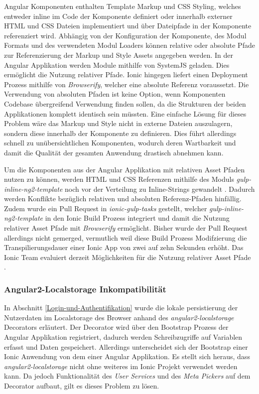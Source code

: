Angular Komponenten enthalten Template Markup und \ac{CSS} Styling, welches entweder inline im Code der Komponente
definiert oder innerhalb externer \ac{HTML} und \ac{CSS} Dateien implementiert und über Dateipfade in der Komponente referenziert wird.
Abhängig von der Konfiguration der Komponente, des Modul Formats und des verwendeten Modul Loaders
können relative oder absolute Pfade zur Referenzierung der Markup und Style Assets angegeben werden.
In der Angular Applikation werden Module mithilfe von SystemJS geladen. Dies ermöglicht die Nutzung relativer Pfade.
Ionic hingegen liefert einen Deployment Prozess mithilfe von \emph{Browserify}, welcher eine absolute Referenz voraussetzt.
Die Verwendung von absoluten Pfaden ist keine Option, wenn Komponenten Codebase übergreifend Verwendung finden sollen,
da die Strukturen der beiden Applikationen komplett identisch sein müssten.
Eine einfache Lösung für dieses Problem wäre das Markup und Style nicht in externe Dateien auszulagern,
sondern diese innerhalb der Komponente zu definieren.
Dies führt allerdings schnell zu unübersichtlichen Komponenten,
wodurch deren Wartbarkeit und damit die Qualität der gesamten Anwendung drastisch abnehmen kann.

Um die Komponenten aus der Angular Applikation mit relativen Asset Pfaden nutzen zu können,
werden \ac{HTML} und \ac{CSS} Referenzen mithilfe des Moduls \emph{gulp-inline-ng2-template} noch vor der Verteilung zu Inline-Strings gewandelt \cite{ludoh30:online}.
Dadurch werden Konflikte bezüglich relativen und absoluten Referenz-Pfaden hinfällig.
Zudem wurde ein Pull Request in \emph{ionic-gulp-tasks} gestellt, welcher \emph{gulp-inline-ng2-template}
in den Ionic Build Prozess integriert und damit die Nutzung relativer Asset Pfade mit \emph{Browserify} ermöglicht.
Bisher wurde der Pull Request allerdings nicht gemerged, vermutlich weil diese Build Prozess Modifzierung die
Transpilierungsdauer einer Ionic App von zwei auf zehn Sekunden erhöht.
Das Ionic Team evaluiert derzeit Möglichkeiten für die Nutzung relativer Asset Pfade \cite{relat31:online}.

\subsubsection{Angular2-Localstorage Inkompatibilität}
In Abschnitt \ref{Login-und-Authentifikation} wurde die lokale persistierung der Nutzerdaten im Localstorage
des Browser anhand des \emph{angular2-localstorage} Decorators erläutert.
Der Decorator wird über den Bootstrap Prozess der Angular Applikation registriert,
dadurch werden Schreibzugriffe auf Variablen erfasst und Daten gespeichert.
Allerdings unterscheidet sich der Bootstrap einer Ionic Anwendung von dem einer Angular Applikation.
Es stellt sich heraus, dass \emph{angular2-localstorage} nicht ohne weiteres im Ionic Projekt verwendet werden kann.
Da jedoch Funktionalität des \emph{User Services} und des \emph{Meta Pickers} auf dem Decorator aufbaut,
gilt es dieses Problem zu lösen.

